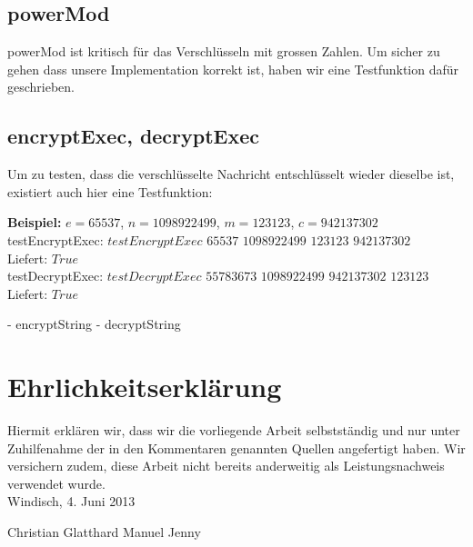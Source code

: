 \documentclass[a4paper, 11pt]{article} %
\begin{document}
\subsection{powerMod}
powerMod ist kritisch für das Verschlüsseln mit grossen Zahlen. Um sicher zu gehen dass unsere Implementation korrekt ist, haben wir eine Testfunktion dafür geschrieben.


\subsection{encryptExec, decryptExec}
Um zu testen, dass die verschlüsselte Nachricht entschlüsselt wieder dieselbe ist, existiert auch hier eine Testfunktion:

\textbf{Beispiel:} $e=65537$, $n=1098922499$, $m=123123$, $c=942137302$\\
testEncryptExec: $testEncryptExec$ $65537$ $1098922499$ $123123$ $942137302$\\
Liefert: $True$\\
testDecryptExec: $testDecryptExec$ $55783673$ $1098922499$ $942137302$ $123123$\\
Liefert: $True$

- encryptString
- decryptString

\section{Ehrlichkeitserklärung}
Hiermit erklären wir, dass wir die vorliegende Arbeit selbstständig und nur unter Zuhilfenahme der in den Kommentaren genannten Quellen angefertigt haben. Wir versichern zudem, diese Arbeit nicht bereits anderweitig als Leistungsnachweis verwendet wurde.\\
Windisch, 4. Juni 2013

Christian Glatthard                          Manuel Jenny		
\end{document}
